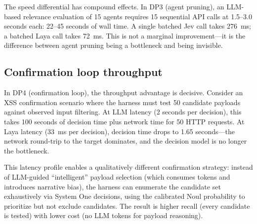 \documentclass[conference]{IEEEtran}
\begin{document}
\begin{table}[h]
\centering
\caption{Decision latency as reported by each source. Jev and Laya values are from their published documentation on different tasks and hardware; LLM baseline from observed claude-opus-4-8 response times in our setup. Direct comparison is informational, not a controlled benchmark.}
\label{tab:latency}
\small
{}
\end{table}

The speed differential has compound effects. In DP3 (agent pruning), an LLM-based relevance evaluation of 15 agents requires 15 sequential API calls at 1.5--3.0 seconds each: 22--45 seconds of wall time. A single batched Jev call takes 276~ms; a batched Laya call takes 72~ms. This is not a marginal improvement---it is the difference between agent pruning being a bottleneck and being invisible.

\subsection{Confirmation loop throughput}

In DP4 (confirmation loop), the throughput advantage is decisive. Consider an XSS confirmation scenario where the harness must test 50 candidate payloads against observed input filtering. At LLM latency (2 seconds per decision), this takes 100 seconds of decision time plus network time for 50 HTTP requests. At Laya latency (33~ms per decision), decision time drops to 1.65 seconds---the network round-trip to the target dominates, and the decision model is no longer the bottleneck.

This latency profile enables a qualitatively different confirmation strategy: instead of LLM-guided ``intelligent'' payload selection (which consumes tokens and introduces narrative bias), the harness can enumerate the candidate set exhaustively via System One decisions, using the calibrated Noul probability to prioritize but not exclude candidates. The result is higher recall (every candidate is tested) with lower cost (no LLM tokens for payload reasoning).
\end{document}
